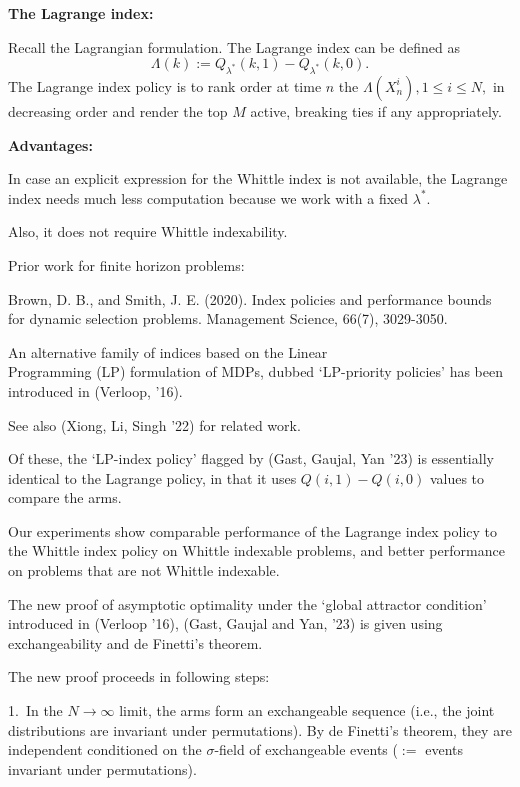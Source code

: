 \documentclass{slides}
\begin{document}
\newpage
{\large \color{dred} 

\textbf{The Lagrange index:}

Recall the Lagrangian formulation. The {Lagrange index} can be defined as
$$\Lambda (k) := Q_{\lambda^*}(k,1) - Q_{\lambda^*}(k,0).$$
The Lagrange index policy is to rank order at time $n$ the $\Lambda(X^i_n), 1 \leq i \leq N,$ in decreasing order and render the top $M$ active, breaking ties if any appropriately.

\newpage

\textbf{Advantages:}

In case an explicit expression for the Whittle index is not available, the Lagrange index needs much less computation because we work with a fixed $\lambda^*$.  

Also, it does not require Whittle indexability.

Prior work for finite horizon problems:

Brown, D. B., and Smith, J. E. (2020).
Index policies and performance bounds for dynamic selection problems.
Management Science, 66(7), 3029-3050.

\newpage

An alternative family of indices based on the {\color{red} Linear\\ Programming (LP) } formulation of MDPs, dubbed `LP-priority policies'  has been introduced in (Verloop, '16). 

See also (Xiong, Li, Singh '22) for related work. 

Of these, the `LP-index policy' flagged by (Gast, Gaujal,  Yan '23) is essentially identical to the Lagrange policy, in that it uses $Q(i,1) - Q(i,0)$ values to compare the arms. 

\newpage

Our experiments show comparable performance of the Lagrange index policy to the Whittle index policy on Whittle indexable problems, and better performance on problems that are not Whittle indexable.

The new proof of asymptotic optimality  under the `global attractor condition' introduced in (Verloop '16), (Gast, Gaujal and Yan, '23) is given using exchangeability and de Finetti's theorem.

\newpage

The new proof proceeds in following steps:

1.\ In the $N \to \infty$ limit, the arms form an exchangeable sequence (i.e., the joint distributions are invariant under permutations). By de Finetti's theorem, they are independent conditioned on the $\sigma$-field of exchangeable events ($:=$  events invariant under permutations).

}
\end{document}

